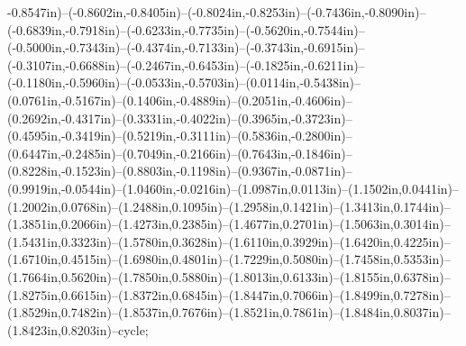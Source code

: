 -0.8547in)--(-0.8602in,-0.8405in)--(-0.8024in,-0.8253in)--(-0.7436in,-0.8090in)--(-0.6839in,-0.7918in)--(-0.6233in,-0.7735in)--(-0.5620in,-0.7544in)--(-0.5000in,-0.7343in)--(-0.4374in,-0.7133in)--(-0.3743in,-0.6915in)--(-0.3107in,-0.6688in)--(-0.2467in,-0.6453in)--(-0.1825in,-0.6211in)--(-0.1180in,-0.5960in)--(-0.0533in,-0.5703in)--(0.0114in,-0.5438in)--(0.0761in,-0.5167in)--(0.1406in,-0.4889in)--(0.2051in,-0.4606in)--(0.2692in,-0.4317in)--(0.3331in,-0.4022in)--(0.3965in,-0.3723in)--(0.4595in,-0.3419in)--(0.5219in,-0.3111in)--(0.5836in,-0.2800in)--(0.6447in,-0.2485in)--(0.7049in,-0.2166in)--(0.7643in,-0.1846in)--(0.8228in,-0.1523in)--(0.8803in,-0.1198in)--(0.9367in,-0.0871in)--(0.9919in,-0.0544in)--(1.0460in,-0.0216in)--(1.0987in,0.0113in)--(1.1502in,0.0441in)--(1.2002in,0.0768in)--(1.2488in,0.1095in)--(1.2958in,0.1421in)--(1.3413in,0.1744in)--(1.3851in,0.2066in)--(1.4273in,0.2385in)--(1.4677in,0.2701in)--(1.5063in,0.3014in)--(1.5431in,0.3323in)--(1.5780in,0.3628in)--(1.6110in,0.3929in)--(1.6420in,0.4225in)--(1.6710in,0.4515in)--(1.6980in,0.4801in)--(1.7229in,0.5080in)--(1.7458in,0.5353in)--(1.7664in,0.5620in)--(1.7850in,0.5880in)--(1.8013in,0.6133in)--(1.8155in,0.6378in)--(1.8275in,0.6615in)--(1.8372in,0.6845in)--(1.8447in,0.7066in)--(1.8499in,0.7278in)--(1.8529in,0.7482in)--(1.8537in,0.7676in)--(1.8521in,0.7861in)--(1.8484in,0.8037in)--(1.8423in,0.8203in)--cycle;
